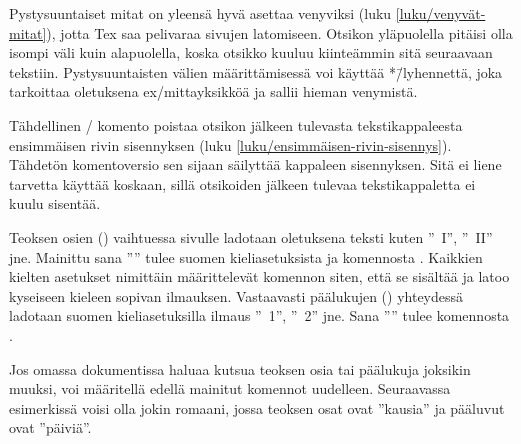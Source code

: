 \begin{koodilohkosis}
\end{koodilohkosis}

\noindent
Pystysuuntaiset mitat on yleensä hyvä asettaa venyviksi (luku
\ref{luku/venyvät-mitat}), jotta Tex saa pelivaraa sivujen latomiseen.
Otsikon yläpuolella pitäisi olla isompi väli kuin alapuolella, koska
otsikko kuuluu kiinteämmin sitä seuraavaan tekstiin. Pystysuuntaisten
välien määrittämisessä voi käyttää *\=/lyhennettä, joka tarkoittaa
oletuksena ex\-/mittayksikköä ja sallii hieman venymistä.

\begin{koodilohkosis}
\end{koodilohkosis}

\noindent
Tähdellinen \-/ komento poistaa otsikon jälkeen
tulevasta tekstikappaleesta ensimmäisen rivin sisennyksen (luku
\ref{luku/ensimmäisen-rivin-sisennys}). Tähdetön komentoversio
 sen sijaan säilyttää kappaleen sisennyksen. Sitä
ei liene tarvetta käyttää koskaan, sillä otsikoiden jälkeen tulevaa
tekstikappaletta ei kuulu sisentää.

Teoksen osien () vaihtuessa sivulle ladotaan oletuksena
teksti kuten ''\partname~I'', ''\partname~II'' jne. Mainittu sana
''\partname'' tulee suomen kieliasetuksista ja komennosta
. Kaikkien kielten asetukset nimittäin määrittelevät
komennon  siten, että se sisältää ja latoo kyseiseen
kieleen sopivan ilmauksen. Vastaavasti päälukujen ()
yhteydessä ladotaan suomen kieliasetuksilla ilmaus ''\chaptername~1'',
''\chaptername~2'' jne. Sana ''\chaptername'' tulee komennosta
.

Jos omassa dokumentissa haluaa kutsua teoksen osia tai päälukuja
joksikin muuksi, voi määritellä edellä mainitut komennot uudelleen.
Seuraavassa esimerkissä voisi olla jokin romaani, jossa teoksen osat
ovat ''kausia'' ja pääluvut ovat ''päiviä''.

